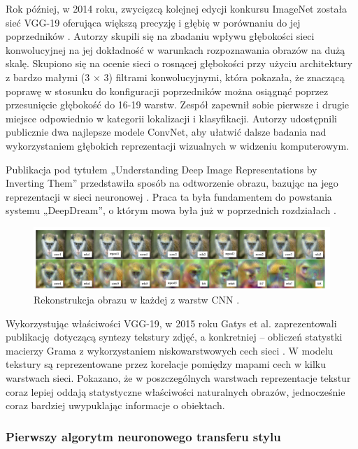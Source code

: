 \documentclass[12pt]{article}
\begin{document}
Rok później, w 2014 roku, zwycięzcą kolejnej edycji konkursu ImageNet została sieć VGG-19 oferująca większą precyzję i głębię w porównaniu do jej poprzedników \cite{34}. Autorzy skupili się na zbadaniu wpływu głębokości sieci konwolucyjnej na jej dokładność w warunkach rozpoznawania obrazów na dużą skalę. Skupiono się na ocenie sieci o rosnącej głębokości przy użyciu architektury z bardzo małymi (3 × 3) filtrami konwolucyjnymi, która pokazała, że znaczącą poprawę w stosunku do konfiguracji poprzedników można osiągnąć poprzez przesunięcie głębokość do 16-19 warstw. Zespół zapewnił sobie pierwsze i drugie miejsce odpowiednio w kategorii lokalizacji i klasyfikacji. Autorzy udostępnili publicznie dwa najlepsze modele ConvNet, aby ułatwić dalsze badania nad wykorzystaniem głębokich reprezentacji wizualnych w widzeniu komputerowym.

Publikacja pod tytułem „Understanding Deep Image Representations by Inverting Them” przedstawiła sposób na odtworzenie obrazu, bazując na jego reprezentacji w sieci neuronowej \cite{35}. Praca ta była fundamentem do powstania systemu „DeepDream”, o którym mowa była już w poprzednich rozdziałach \cite{10}.
\begin{figure}[H]
    \centering
    \includegraphics[width=\textwidth]{u8.png}
    \caption{Rekonstrukcja obrazu w każdej z warstw CNN \cite{35}.}
    \label{fig:5}
\end{figure}

Wykorzystując właściwości VGG-19, w 2015 roku Gatys et al. zaprezentowali publikację dotyczącą syntezy tekstury zdjęć, a konkretniej – obliczeń statystki macierzy Grama z wykorzystaniem niskowarstwowych cech sieci \cite{24}. W modelu tekstury są reprezentowane przez korelacje pomiędzy mapami cech w kilku warstwach sieci. Pokazano, że w poszczególnych warstwach reprezentacje tekstur coraz lepiej oddają statystyczne właściwości naturalnych obrazów, jednocześnie coraz bardziej uwypuklając informacje o obiektach.

\subsubsection{Pierwszy algorytm neuronowego transferu stylu}
\end{document}
